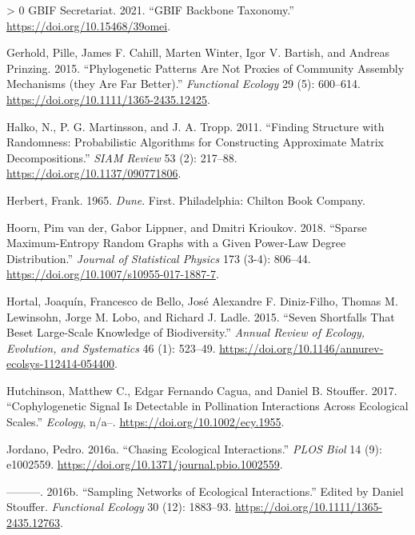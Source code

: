 \documentclass[11pt]{article}
\newlength{\cslhangindent}
\newenvironment{CSLReferences}[3] %
 {%
  \setlength{\parindent}{0pt}
  \ifodd #1 \everypar{\setlength{\hangindent}{\cslhangindent}}\ignorespaces\fi
  \ifnum #2 > 0
  \setlength{\parskip}{#2\baselineskip}
  \fi
 }%
 {}
\begin{document}
\begin{CSLReferences}{1}{0}
\leavevmode\hypertarget{ref-GBIFSecretariat2021GbiBac}{}%
GBIF Secretariat. 2021. {``GBIF Backbone Taxonomy.''}
\url{https://doi.org/10.15468/39omei}.

\leavevmode\hypertarget{ref-Gerhold2015PhyPat}{}%
Gerhold, Pille, James F. Cahill, Marten Winter, Igor V. Bartish, and
Andreas Prinzing. 2015. {``Phylogenetic Patterns Are Not Proxies of
Community Assembly Mechanisms (they Are Far Better).''} \emph{Functional
Ecology} 29 (5): 600--614.
\url{https://doi.org/10.1111/1365-2435.12425}.

\leavevmode\hypertarget{ref-Halko2011FinStr}{}%
Halko, N., P. G. Martinsson, and J. A. Tropp. 2011. {``Finding Structure
with Randomness: Probabilistic Algorithms for Constructing Approximate
Matrix Decompositions.''} \emph{SIAM Review} 53 (2): 217--88.
\url{https://doi.org/10.1137/090771806}.

\leavevmode\hypertarget{ref-Herbert1965Dun}{}%
Herbert, Frank. 1965. \emph{Dune}. First. Philadelphia: Chilton Book
Company.

\leavevmode\hypertarget{ref-vanderHoorn2018SpaMax}{}%
Hoorn, Pim van der, Gabor Lippner, and Dmitri Krioukov. 2018. {``Sparse
Maximum-Entropy Random Graphs with a Given Power-Law Degree
Distribution.''} \emph{Journal of Statistical Physics} 173 (3-4):
806--44. \url{https://doi.org/10.1007/s10955-017-1887-7}.

\leavevmode\hypertarget{ref-Hortal2015SevSho}{}%
Hortal, Joaquín, Francesco de Bello, José Alexandre F. Diniz-Filho,
Thomas M. Lewinsohn, Jorge M. Lobo, and Richard J. Ladle. 2015. {``Seven
Shortfalls That Beset Large-Scale Knowledge of Biodiversity.''}
\emph{Annual Review of Ecology, Evolution, and Systematics} 46 (1):
523--49. \url{https://doi.org/10.1146/annurev-ecolsys-112414-054400}.

\leavevmode\hypertarget{ref-Hutchinson2017CopSig}{}%
Hutchinson, Matthew C., Edgar Fernando Cagua, and Daniel B. Stouffer.
2017. {``Cophylogenetic Signal Is Detectable in Pollination Interactions
Across Ecological Scales.''} \emph{Ecology}, n/a--.
\url{https://doi.org/10.1002/ecy.1955}.

\leavevmode\hypertarget{ref-Jordano2016ChaEco}{}%
Jordano, Pedro. 2016a. {``Chasing Ecological Interactions.''} \emph{PLOS
Biol} 14 (9): e1002559.
\url{https://doi.org/10.1371/journal.pbio.1002559}.

\leavevmode\hypertarget{ref-Jordano2016SamNet}{}%
---------. 2016b. {``Sampling Networks of Ecological Interactions.''}
Edited by Daniel Stouffer. \emph{Functional Ecology} 30 (12): 1883--93.
\url{https://doi.org/10.1111/1365-2435.12763}.


\end{CSLReferences}
\end{document}
